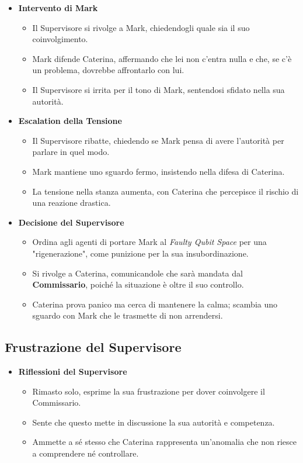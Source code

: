\begin{itemize}
    \item \textbf{Intervento di Mark}
    \begin{itemize}
        \item Il Supervisore si rivolge a Mark, chiedendogli quale sia il suo coinvolgimento.
        \item Mark difende Caterina, affermando che lei non c'entra nulla e che, se c'è un problema, dovrebbe affrontarlo con lui.
        \item Il Supervisore si irrita per il tono di Mark, sentendosi sfidato nella sua autorità.
    \end{itemize}

    \item \textbf{Escalation della Tensione}
    \begin{itemize}
        \item Il Supervisore ribatte, chiedendo se Mark pensa di avere l'autorità per parlare in quel modo.
        \item Mark mantiene uno sguardo fermo, insistendo nella difesa di Caterina.
        \item La tensione nella stanza aumenta, con Caterina che percepisce il rischio di una reazione drastica.
    \end{itemize}

    \item \textbf{Decisione del Supervisore}
    \begin{itemize}
        \item Ordina agli agenti di portare Mark al \emph{Faulty Qubit Space} per una "rigenerazione", come punizione per la sua insubordinazione.
        \item Si rivolge a Caterina, comunicandole che sarà mandata dal \textbf{Commissario}, poiché la situazione è oltre il suo controllo.
        \item Caterina prova panico ma cerca di mantenere la calma; scambia uno sguardo con Mark che le trasmette di non arrendersi.
    \end{itemize}
\end{itemize}

\subsection*{Frustrazione del Supervisore}

\begin{itemize}
    \item \textbf{Riflessioni del Supervisore}
    \begin{itemize}
        \item Rimasto solo, esprime la sua frustrazione per dover coinvolgere il Commissario.
        \item Sente che questo mette in discussione la sua autorità e competenza.
        \item Ammette a sé stesso che Caterina rappresenta un'anomalia che non riesce a comprendere né controllare.
    \end{itemize}
\end{itemize}

